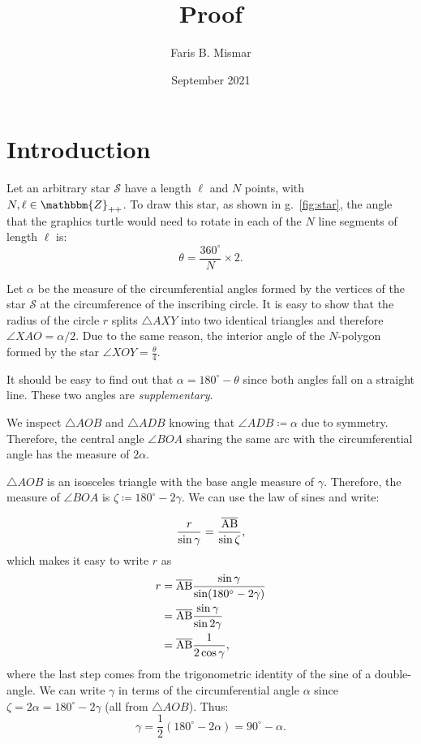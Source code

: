 \documentclass{article}
\title{Proof}
\author{Faris B. Mismar}
\date{September 2021}
\begin{document}
\maketitle

\section{Introduction}

Let an arbitrary star $\mathcal{S}$ have a length $\ell$ and $N$ points, with $N, \ell \in \mathbbm{Z}_{++}$.  To draw this star, as shown in g.~\ref{fig:star}, the angle that the graphics turtle would need to rotate in each of the $N$ line segments of length $\ell$ is:
\begin{equation}
    \theta = \frac{360^\circ}{N} \times 2.
\end{equation}%

Let $\alpha$ be the measure of the circumferential angles formed by the vertices of the star $\mathcal{S}$ at the circumference of the inscribing circle.  It is easy to show that the radius of the circle $r$ splits $\triangle AXY$ into two identical triangles and therefore $\angle XAO = \alpha/2$.  Due to the same reason, the interior angle of the $N$-polygon formed by the star $\angle XOY = \frac{\theta}{4}$.

It should be easy to find out that $\alpha = 180^\circ - \theta$ since both angles fall on a straight line.  These two angles are \textit{supplementary}.

We inspect $\triangle AOB$ and $\triangle ADB$ knowing that $\angle ADB \coloneqq \alpha$ due to symmetry.  Therefore, the central angle $\angle BOA$ sharing the same arc with the circumferential angle has the measure of $2\alpha$.

$\triangle AOB$ is an isosceles triangle with the base angle measure of $\gamma$.  Therefore, the measure of $\angle BOA$ is $\zeta \coloneqq 180^\circ - 2 \gamma$.  We can use the law of sines and write:

\begin{equation}
    \frac{r}{\sin \gamma}  = \frac{\overline{\rm AB}}{\sin \zeta},
\end{equation}
which makes it easy to write $r$ as
\begin{equation}
\begin{aligned}
r &= \overline{\rm AB} \frac{\sin \gamma}{\sin (180^\circ - 2\gamma)} \\
  &= \overline{\rm AB} \frac{\sin \gamma}{\sin 2\gamma} \\ 
  &= \overline{\rm AB} \frac{1}{2\cos \gamma}, \\ 
\end{aligned}
\end{equation}%
where the last step comes from the trigonometric identity of the sine of a double-angle.  We can write $\gamma$ in terms of the circumferential angle $\alpha$ since $\zeta = 2\alpha = 180^\circ - 2\gamma$ (all from $\triangle AOB$).  Thus:
\begin{equation}
    \gamma = \frac{1}{2} (180^\circ - 2\alpha) = 90^\circ - \alpha.
\end{equation}
\end{document}
